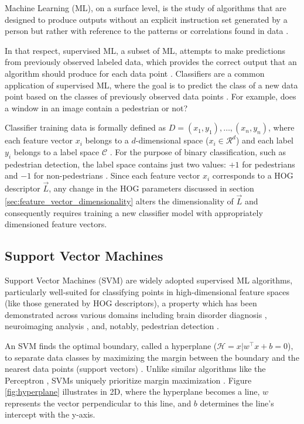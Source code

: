 Machine Learning (ML), on a surface level, is the study of algorithms that are designed to produce outputs without an explicit instruction set generated by a person but rather with reference to the patterns or correlations found in data \cite{what_is_ml}. 

In that respect, supervised ML, a subset of ML, attempts to make predictions from previously observed labeled data, which provides the correct output that an algorithm should produce for each data point \cite{supervised_learning}. Classifiers are a common application of supervised ML, where the goal is to predict the class of a new data point based on the classes of previously observed data points \cite{derek_2020_svm}. For example, does a window in an image contain a pedestrian or not?

Classifier training data is formally defined as $D={ (x_{1},y_{1}),\dots,(x_{n},y_{n}) }$, where each feature vector $x_i$ belongs to a $d$-dimensional space ($x_i\in \mathcal{R}^d$) and each label $y_i$ belongs to a label space $\mathcal{C}$ \cite{supervised_learning}. For the purpose of binary classification, such as pedestrian detection, the label space contains just two values: $+1$ for pedestrians and $-1$ for non-pedestrians \cite{cornell_svm}. Since each feature vector $x_i$ corresponds to a HOG descriptor $\vec{L}$, any change in the HOG parameters discussed in section \ref{sec:feature_vector_dimensionality} alters the dimensionality of $\vec{L}$ and consequently requires training a new classifier model with appropriately dimensioned feature vectors.

\subsection{Support Vector Machines}

Support Vector Machines (SVM) are widely adopted supervised ML algorithms, particularly well-suited for classifying points in high-dimensional feature spaces \cite{ng_support} (like those generated by HOG descriptors), a property which has been demonstrated across various domains including brain disorder diagnosis \cite{derek_2020_svm}, neuroimaging analysis \cite{svm_mri}, and, notably, pedestrian detection \cite{dalal_2005_histograms}.

An SVM finds the optimal boundary, called a hyperplane ($\mathcal{H}={ x|w^\top x + b = 0 }$), to separate data classes by maximizing the margin between the boundary and the nearest data points (support vectors) \cite{derek_2020_svm} \cite{cornell_svm_notes}. Unlike similar algorithms like the Perceptron \cite{cornell_perceptron}, SVMs uniquely prioritize margin maximization \cite{ng_support}. Figure \ref{fig:hyperplane} illustrates in 2D, where the hyperplane becomes a line, $w$ represents the vector perpendicular to this line, and $b$ determines the line's intercept with the y-axis.

